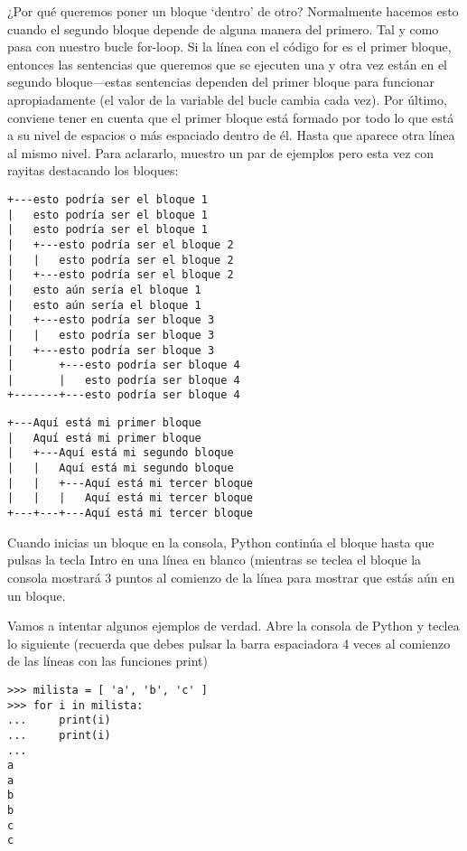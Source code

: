 ¿Por qué queremos poner un bloque `dentro' de otro?  Normalmente hacemos esto cuando el segundo bloque depende de alguna manera del primero.  Tal y como pasa con nuestro bucle for-loop.  Si la línea con el código for es el primer bloque, entonces las sentencias que queremos que se ejecuten una y otra vez están en el segundo bloque---estas sentencias dependen del primer bloque para funcionar apropiadamente (el valor de la variable del bucle cambia cada vez).
Por último, conviene tener en cuenta que el primer bloque está formado por todo lo que está a su nivel de espacios o más espaciado dentro de él. Hasta que aparece otra línea al mismo nivel.
Para aclararlo, muestro un par de ejemplos pero esta vez con rayitas destacando los bloques:

\begin{listing}
\begin{verbatim}
+---esto podría ser el bloque 1
|   esto podría ser el bloque 1
|   esto podría ser el bloque 1
|   +---esto podría ser el bloque 2
|   |   esto podría ser el bloque 2
|   +---esto podría ser el bloque 2
|   esto aún sería el bloque 1
|   esto aún sería el bloque 1
|   +---esto podría ser bloque 3
|   |   esto podría ser bloque 3
|   +---esto podría ser bloque 3
|       +---esto podría ser bloque 4
|       |   esto podría ser bloque 4
+-------+---esto podría ser bloque 4
\end{verbatim}
\end{listing}


\begin{listing}
\begin{verbatim}
+---Aquí está mi primer bloque
|   Aquí está mi primer bloque
|   +---Aquí está mi segundo bloque
|   |   Aquí está mi segundo bloque
|   |   +---Aquí está mi tercer bloque
|   |   |   Aquí está mi tercer bloque
+---+---+---Aquí está mi tercer bloque
\end{verbatim}
\end{listing}

Cuando inicias un bloque en la consola, Python continúa el bloque hasta que pulsas la tecla Intro en una línea en blanco (mientras se teclea el bloque la consola mostrará 3 puntos al comienzo de la línea para mostrar que estás aún en un bloque.

Vamos a intentar algunos ejemplos de verdad.  Abre la consola de Python y teclea  lo siguiente (recuerda que debes pulsar la barra espaciadora 4 veces al comienzo de las líneas con las funciones print)

\begin{listing}
\begin{verbatim}
>>> milista = [ 'a', 'b', 'c' ]
>>> for i in milista:
...     print(i)
...     print(i)
...
a
a
b
b
c
c
\end{verbatim}
\end{listing}


